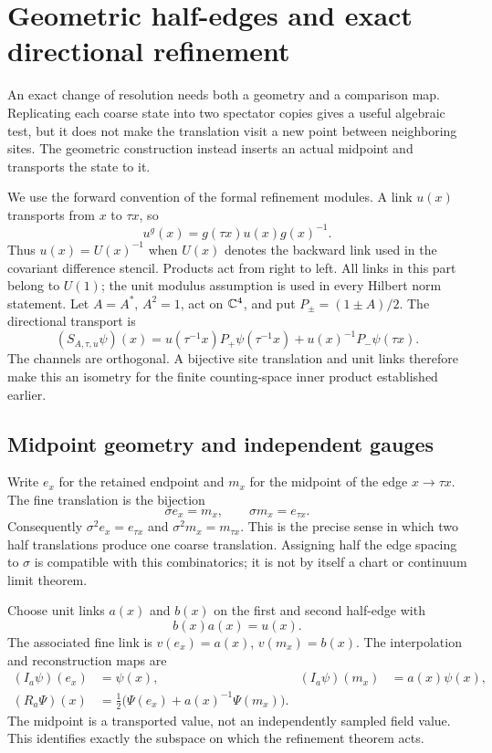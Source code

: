 \section{Geometric half-edges and exact directional refinement}
\label{g:halfedges}
An exact change of resolution needs both a geometry and a comparison map. Replicating each coarse state into two spectator copies gives a useful algebraic test, but it does not make the translation visit a new point between neighboring sites. The geometric construction instead inserts an actual midpoint and transports the state to it.

We use the forward convention of the formal refinement modules. A link $u(x)$ transports from $x$ to $\tau x$, so
\[
 u^g(x)=g(\tau x)u(x)g(x)^{-1}.
\]
Thus $u(x)=U(x)^{-1}$ when $U(x)$ denotes the backward link used in the covariant difference stencil. Products act from right to left. All links in this part belong to $U(1)$; the unit modulus assumption is used in every Hilbert norm statement. Let $A=A^*$, $A^2=1$, act on $\mathbb C^4$, and put $P_\pm=(1\pm A)/2$. The directional transport is
\begin{equation}
 (S_{A,\tau,u}\psi)(x)
 =u(\tau^{-1}x)P_+\psi(\tau^{-1}x)
  +u(x)^{-1}P_-\psi(\tau x).
 \label{g:source-shift}
\end{equation}
The channels are orthogonal. A bijective site translation and unit links therefore make this an isometry for the finite counting-space inner product established earlier.

\subsection{Midpoint geometry and independent gauges}
Write $e_x$ for the retained endpoint and $m_x$ for the midpoint of the edge $x\to\tau x$. The fine translation is the bijection
\[
 \sigma e_x=m_x,\qquad \sigma m_x=e_{\tau x}.
\]
Consequently $\sigma^2e_x=e_{\tau x}$ and $\sigma^2m_x=m_{\tau x}$. This is the precise sense in which two half translations produce one coarse translation. Assigning half the edge spacing to $\sigma$ is compatible with this combinatorics; it is not by itself a chart or continuum limit theorem.

Choose unit links $a(x)$ and $b(x)$ on the first and second half-edge with
\begin{equation}
 b(x)a(x)=u(x).
 \label{g:ordered-product}
\end{equation}
The associated fine link is $v(e_x)=a(x)$, $v(m_x)=b(x)$. The interpolation and reconstruction maps are
\begin{align}
 (I_a\psi)(e_x)&=\psi(x),&
 (I_a\psi)(m_x)&=a(x)\psi(x),\label{g:edge-interpolation}\\
 (R_a\Psi)(x)&=\tfrac12\bigl(\Psi(e_x)+a(x)^{-1}\Psi(m_x)\bigr).
 \label{g:edge-restriction}
\end{align}
The midpoint is a transported value, not an independently sampled field value. This identifies exactly the subspace on which the refinement theorem acts.

